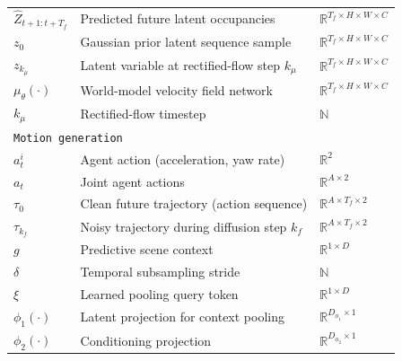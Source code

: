 \documentclass[runningheads]{llncs}
\begin{document}
{\begin{longtable}{lll}
$\hat{Z}_{t+1:t+T_f}$ & Predicted future latent occupancies & $\mathbb{R}^{T_f \times H \times W \times C}$ \\

$z_0$ & Gaussian prior latent sequence sample & $\mathbb{R}^{T_f \times H \times W \times C}$ \\

$z_{k_\mu}$ & Latent variable at rectified-flow step $k_\mu$ & $\mathbb{R}^{T_f \times H \times W \times C}$ \\


$\mu_\theta(\cdot)$ & World-model velocity field network & $\mathbb{R}^{T_f \times H \times W \times C}$ \\

$k_\mu$ & Rectified-flow timestep & $\mathbb N$ \\


\midrule

\multicolumn{3}{l}{\texttt{Motion generation}} \\

$a_t^i$ & Agent action (acceleration, yaw rate) & $\mathbb{R}^{2}$ \\

$a_t$ & Joint agent actions & $\mathbb{R}^{A \times 2}$ \\

$\tau_0$ & Clean future trajectory (action sequence) & $\mathbb{R}^{A \times T_f \times 2}$ \\

$\tau_{k_f}$ & Noisy trajectory during diffusion step $k_f$ & $\mathbb{R}^{A \times T_f \times 2}$ \\

$g$ & Predictive scene context & $\mathbb{R}^{1 \times D}$ \\

$\delta$ & Temporal subsampling stride & $\mathbb N$ \\

$\xi$ & Learned pooling query token & $\mathbb{R}^{1 \times D}$ \\

$\phi_1(\cdot)$ & Latent projection for context pooling & $\mathbb R^{D_{\phi_1} \times 1}$ \\

$\phi_2(\cdot)$ & Conditioning projection & $\mathbb R^{D_{\phi_2} \times 1}$\\


\end{longtable}}
\end{document}
